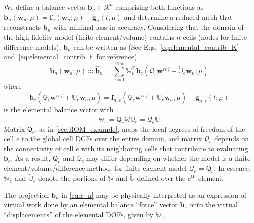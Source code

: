 \documentclass[11pt]{article}
\renewcommand{\vec}[1]{\mathbf{#1}}
\newcommand{\mat}[1]{\mathsf{#1}}
\begin{document}
        We define a balance vector $\vec{b}_n\in\mathcal{R}^{n}$ comprising both functions as $\vec{b}_n(\vec{w}_n; \mu) = \vec{f}_n(\vec{w}_n; \mu) - \vec{g}_n(t; \mu)$ and determine a reduced mesh that reconstructs $\vec{b}_n$ with minimal  loss in accuracy.
        Considering that the domain of the  high-fidelity model (finite element/volume) contains $n$
        cells (nodes for finite difference models), $\vec{b}_n$ can be written as (See Eqs.~\ref{eq:elemental_contrib_K} and~\ref{eq:elemental_contrib_f} for reference)
        \begin{equation}
        \vec{b}_n(\vec{w}_n; \mu) \approx \widehat{\vec{b}}_n = \sum_{e=1}^{n_{\text{cell}}} \mathbb{W}_e^{\top} \vec{b}_{e} (\mathcal{Q}_e\vec{w}^{ref} + \widetilde{\mathbb{U}}_e \vec{w}_n; \mu)
        \label{eq:r_n}
        \end{equation}
        where
        \begin{equation}
        \vec{b}_{e} (\mathcal{Q}_e\vec{w}^{ref} + \widetilde{\mathbb{U}}_e \vec{w}_n; \mu) = \vec{f}_{n,e}(\mathcal{Q}_e\vec{w}^{ref} + \widetilde{\mathbb{U}}_e \vec{w}_n; \mu) - \vec{g}_{n,e}(t; \mu)
        \label{eq:r_e}
        \end{equation}
        is the elemental balance vector with
        \begin{subequations}
            \begin{equation}
            \mathbb{W}_e = \mat{Q}_e\mathbb{W}
            \end{equation}
            \begin{equation}
            \widetilde{\mathbb{U}}_e = \mathcal{Q}_e\widetilde{\mathbb{U}}
            \end{equation}
            \label{eq:ue_we}
        \end{subequations}
        Matrix $\mat{Q}_e$, as in \cref{sec:ROM_example}, maps the local degrees of freedom of the cell $e$ to the global cell DOFs over the entire domain, and matrix $\mathcal{Q}_e$ depends on the connectivity of cell $e$ with its neighboring cells that contribute to evaluating $\vec{b}_e$.
        As a result, $\mat{Q}_e$ and $\mathcal{Q}_e$ may differ depending on whether the model is a  finite element/volume/difference method; for finite element model $\mathcal{Q}_e= \mat{Q}_e$.
        In essence, $\mathbb{W}_e$ and $\widetilde{\mathbb{U}}_e$ denote the portions of $\mathbb{W}$ and $\widetilde{\mathbb{U}}$ defined over the $e^{\text{th}}$ element.


        The projection $\vec{b}_n$ in \cref{eq:r_n} may be physically interpreted as an expression of virtual work done by an elemental balance ``force'' vector $\vec{b}_{e}$ onto the virtual ``displacements'' of the elemental DOFs, given by $\mathbb{W}_e$.
\end{document}
